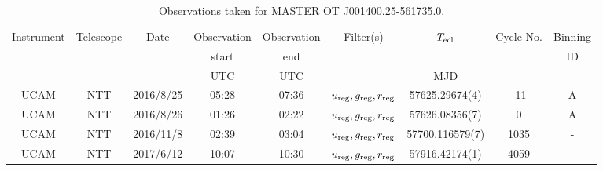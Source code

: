 \begin{table}
	\begin{center}
		\caption{Observations taken for MASTER OT J001400.25-561735.0.}
		\label{table:observing:observation logs MASTER OT J0014}
		\begin{tabular}{ccccccccc}
			\hline
			Instrument & Telescope & Date & Observation  & Observation  & Filter(s) & $T_{\rm ecl}$ & Cycle No. & Binning \\
			 &  &  &  start &  end &  &  &  & ID \\
			 &  &  & UTC & UTC &  & MJD &  &  \\
			\hline
			\hline

            UCAM & NTT & 2016/8/25 & 05:28 & 07:36 & $u_{\rm reg},g_{\rm reg},r_{\rm reg}$ & 57625.29674(4)     & -11   & A \\
            UCAM & NTT & 2016/8/26 & 01:26 & 02:22 & $u_{\rm reg},g_{\rm reg},r_{\rm reg}$ & 57626.08356(7)     &   0   & A \\
            UCAM & NTT & 2016/11/8 & 02:39 & 03:04 & $u_{\rm reg},g_{\rm reg},r_{\rm reg}$ & 57700.116579(7)    & 1035  & - \\
            UCAM & NTT & 2017/6/12 & 10:07 & 10:30 & $u_{\rm reg},g_{\rm reg},r_{\rm reg}$ & 57916.42174(1)     & 4059  & - \\
		   \hline
		\end{tabular}
	\end{center}
\end{table}